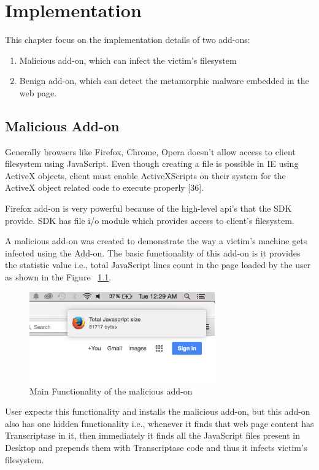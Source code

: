 \chapter{Implementation}

This chapter focus on the implementation details of two add-ons:
\begin{enumerate}
\item Malicious add-on, which can infect the victim's filesystem
\item Benign add-on, which can detect the metamorphic malware embedded in the web page.
\end{enumerate}

\section{Malicious Add-on} 

Generally browsers like Firefox, Chrome, Opera doesn't allow access to client filesystem using JavaScript. Even though creating a file is possible in IE using ActiveX objects, client must enable ActiveXScripts on their system for the ActiveX object related code to execute properly [36]. 

Firefox add-on is very powerful because of the high-level api's that the SDK provide. SDK has file i/o module which provides access to client's filesystem.

A malicious add-on was created to demonstrate the way a victim's machine gets infected using the Add-on. The basic functionality of this add-on is it provides the statistic value i.e., total JavaScript lines count in the page loaded by the user as shown in the Figure ~\ref{fig:maliciousaddon}.

\begin{figure}
    \centering    
    \includegraphics[width=8cm, height=3.9cm]{maliciousaddon.png}
    \caption[Main Functionality of the malicious add-on]{Main Functionality of the malicious add-on}
    \label{fig:maliciousaddon}
\end{figure}

User expects this functionality and installs the malicious add-on, but this add-on also has one hidden functionality i.e., whenever it finds that web page content has Transcriptase in it, then immediately it finds all the JavaScript files present in Desktop and prepends them with Transcriptase code and thus it infects victim's filesystem. 

